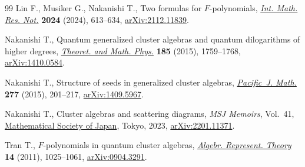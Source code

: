 \begin{thebibliography}{99}
Lin F., Musiker G., Nakanishi T., Two formulas for {$F$}-polynomials,
   \href{https://doi.org/10.1093/imrn/rnad074}{\textit{Int. Math. Res. Not.}} \textbf{2024} (2024), 613--634,
  \href{https://arxiv.org/abs/2112.11839}{arXiv:2112.11839}.

Nakanishi T., Quantum generalized cluster algebras and quantum dilogarithms of
  higher degrees, \href{https://doi.org/10.1007/s11232-015-0377-9}{\textit{Theoret. and Math. Phys.}} \textbf{185} (2015),
  1759--1768, \href{https://arxiv.org/abs/1410.0584}{arXiv:1410.0584}.

Nakanishi T., Structure of seeds in generalized cluster algebras,
  \href{https://doi.org/10.2140/pjm.2015.277.201}{\textit{Pacific~J. Math.}} \textbf{277} (2015), 201--217, \href{https://arxiv.org/abs/1409.5967}{arXiv:1409.5967}.

Nakanishi T., Cluster algebras and scattering diagrams, \textit{MSJ Memoirs}, Vol.~41, \href{https://doi.org/10.1142/e073}{Mathematical Society of Japan}, Tokyo, 2023, \href{https://arxiv.org/abs/2201.11371}{arXiv:2201.11371}.

Tran T., {$F$}-polynomials in quantum cluster algebras,  \href{https://doi.org/10.1007/s10468-010-9226-6}{\textit{Algebr.
  Represent. Theory}} \textbf{14} (2011), 1025--1061, \href{https://arxiv.org/abs/0904.3291}{arXiv:0904.3291}.

\end{thebibliography}\LastPageEnding
